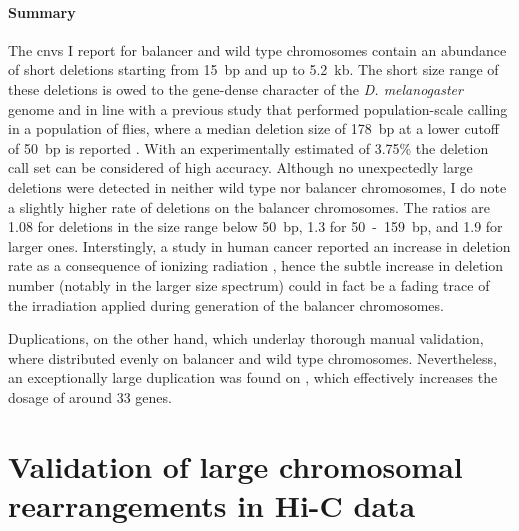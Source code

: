\paragraph{Summary} The \acp{cnv} I report for balancer and wild type
chromosomes contain an abundance of short deletions starting from 15~bp and up
to 5.2~kb. The short size range of these deletions is owed to the gene-dense
character of the \textit{D. melanogaster} genome and in line with a previous
study that performed population-scale \sv calling in a population of flies,
where a median deletion size of 178~bp at a lower cutoff of 50~bp is reported
\citep{Zichner2013}.
With an experimentally estimated \fdr of 3.75\% the deletion call set can be
considered of high accuracy. Although no unexpectedly large deletions were
detected in neither wild type nor balancer chromosomes, I do note a slightly
higher rate of deletions on the balancer chromosomes. The ratios are 1.08 for
deletions in the size range below 50~bp, 1.3 for 50~-~159~bp, and 1.9 for larger
ones. Interstingly, a study in human cancer reported an increase in deletion
rate as a consequence of ionizing radiation \citep{Behjati2016}, hence the
subtle increase in deletion number (notably in the larger size spectrum) could
in fact be a fading trace of the irradiation applied during generation of the
balancer chromosomes.

Duplications, on the other hand, which underlay thorough manual validation,
where distributed evenly on balancer and wild type chromosomes. Nevertheless,
an exceptionally large duplication was found on \cyo, which effectively
increases the dosage of around 33 genes.






\section{Validation of large chromosomal rearrangements in Hi-C data}
\label{sec:balancer_hic_svs}

